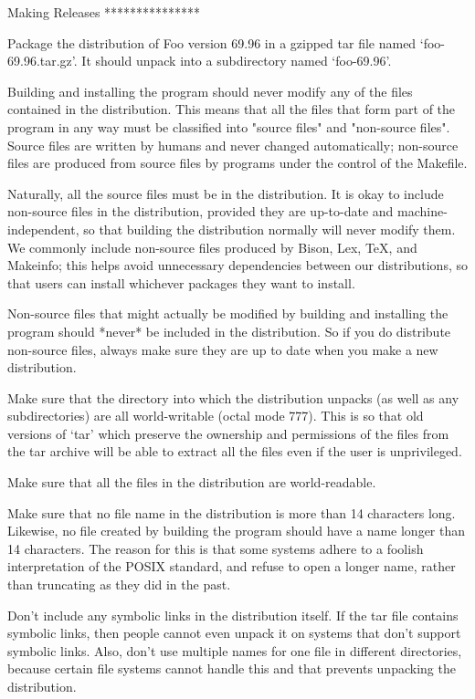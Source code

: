 Making Releases
***************

   Package the distribution of Foo version 69.96 in a gzipped tar file
named `foo-69.96.tar.gz'.  It should unpack into a subdirectory named
`foo-69.96'.

   Building and installing the program should never modify any of the
files contained in the distribution.  This means that all the files
that form part of the program in any way must be classified into "source
files" and "non-source files".  Source files are written by humans and
never changed automatically; non-source files are produced from source
files by programs under the control of the Makefile.

   Naturally, all the source files must be in the distribution.  It is
okay to include non-source files in the distribution, provided they are
up-to-date and machine-independent, so that building the distribution
normally will never modify them.  We commonly include non-source files
produced by Bison, Lex, TeX, and Makeinfo; this helps avoid unnecessary
dependencies between our distributions, so that users can install
whichever packages they want to install.

   Non-source files that might actually be modified by building and
installing the program should *never* be included in the distribution.
So if you do distribute non-source files, always make sure they are up
to date when you make a new distribution.

   Make sure that the directory into which the distribution unpacks (as
well as any subdirectories) are all world-writable (octal mode 777).
This is so that old versions of `tar' which preserve the ownership and
permissions of the files from the tar archive will be able to extract
all the files even if the user is unprivileged.

   Make sure that all the files in the distribution are world-readable.

   Make sure that no file name in the distribution is more than 14
characters long.  Likewise, no file created by building the program
should have a name longer than 14 characters.  The reason for this is
that some systems adhere to a foolish interpretation of the POSIX
standard, and refuse to open a longer name, rather than truncating as
they did in the past.

   Don't include any symbolic links in the distribution itself.  If the
tar file contains symbolic links, then people cannot even unpack it on
systems that don't support symbolic links.  Also, don't use multiple
names for one file in different directories, because certain file
systems cannot handle this and that prevents unpacking the distribution.

